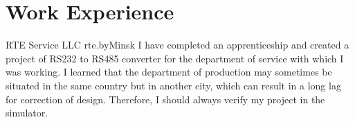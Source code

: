 
\section{Work Experience}
{RTE Service LLC rte.by}{Minsk}{}{
  I have completed an apprenticeship and created a project of RS232 to
  RS485 converter for the department of service with which I was
  working. I learned that the department of production may sometimes be
  situated in the same country but in another city, which can result in
  a long lag for correction of design. Therefore, I should always verify
  my project in the simulator.}


